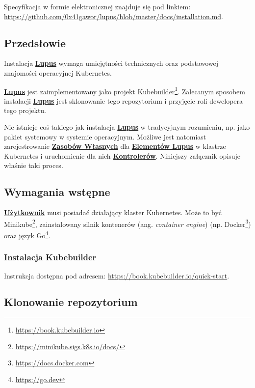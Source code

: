 \label{appendix:2}

Specyfikacja w formie elektronicznej znajduje się pod linkiem: \url{https://github.com/0x41gawor/lupus/blob/master/docs/installation.md}.

\subsection{Przedsłowie}

Instalacja \hyperlink{def:lupus}{\textbf{Lupus}} wymaga umiejętności technicznych oraz podstawowej znajomości operacyjnej Kubernetes.

\hyperlink{def:lupus}{\textbf{Lupus}} jest zaimplementowany jako projekt Kubebuilder\footnote{\url{https://book.kubebuilder.io}}. Zalecanym sposobem instalacji \hyperlink{def:lupus}{\textbf{Lupus}} jest sklonowanie tego repozytorium i przyjęcie roli dewelopera tego projektu.

Nie istnieje coś takiego jak instalacja \hyperlink{def:lupus}{\textbf{Lupus}} w tradycyjnym rozumieniu, np. jako pakiet systemowy w systemie operacyjnym. Możliwe jest natomiast zarejestrowanie \hyperlink{def:zasoby-wlasne}{\textbf{Zasobów Własnych}} dla \hyperlink{def:element-lupus}{\textbf{Elementów Lupus}} w klastrze Kubernetes i uruchomienie dla nich \hyperlink{def:operator-zasobu-element}{\textbf{Kontrolerów}}. Niniejszy załącznik opisuje właśnie taki proces.

\subsection{Wymagania wstępne}

\hyperlink{def:uzytkownik}{\textbf{Użytkownik}} musi posiadać działający klaster Kubernetes. Może to być Minikube\footnote{\url{https://minikube.sigs.k8s.io/docs/}}, zainstalowany silnik kontenerów (ang. \textit{container engine}) (np. Docker\footnote{\url{https://docs.docker.com}}) oraz język Go\footnote{\url{https://go.dev}}.

\subsubsection{Instalacja Kubebuilder}

Instrukcja dostępna pod adresem: \url{https://book.kubebuilder.io/quick-start}.

\subsection{Klonowanie repozytorium}


